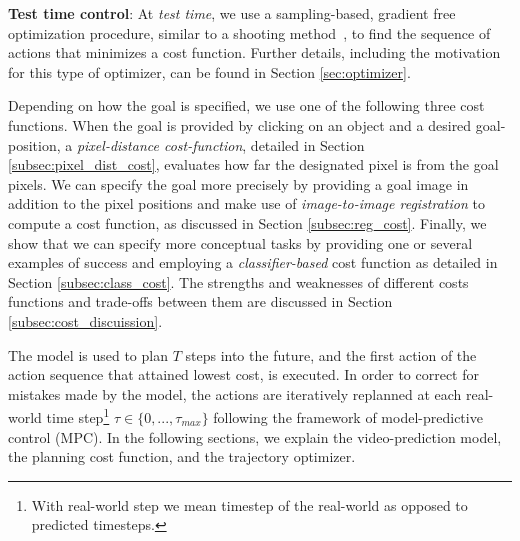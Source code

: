 \noindent \textbf{Test time control}: At \emph{test time}, we use a sampling-based, gradient free optimization procedure, similar to a shooting method~\cite{betts1998survey},
to find the sequence of actions that minimizes a cost function. Further details, including the motivation for this type of optimizer, can be found in Section \ref{sec:optimizer}. 

Depending on how the goal is specified, we use one of the following three cost functions. When the goal is provided by clicking on an object and a desired goal-position, a \emph{pixel-distance cost-function}, detailed in Section \ref{subsec:pixel_dist_cost}, evaluates how far the designated pixel is from the goal pixels. We can specify the goal more precisely by providing a goal image in addition to the pixel positions and make use of \emph{image-to-image registration} to compute a cost function, as discussed in Section \ref{subsec:reg_cost}. Finally, we show that we can specify more conceptual tasks
by providing one or several examples of success and employing a \emph{classifier-based} cost function as detailed in Section \ref{subsec:class_cost}. The strengths and weaknesses of different costs functions and trade-offs between them are discussed in Section \ref{subsec:cost_discuission}. 

The model is used to plan $T$ steps into the future, and the first action of the action sequence that attained lowest cost, is executed. In order to correct for mistakes made by the model, the actions are iteratively replanned at each real-world time step\footnote{With real-world step we mean timestep of the real-world as opposed to predicted timesteps.} $\tau \in \{0,...,\tau_{max}\}$ following the framework of model-predictive control (MPC). 
In the following sections, we explain the video-prediction model, the planning cost function, and the trajectory optimizer.








